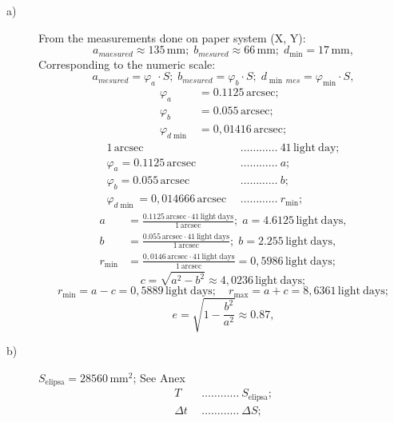 \begin{description}
\item[a)] From the measurements done on paper system (X, Y):
  \[
    a_{maesured} \approx 135\,\mathrm{mm};\;
    b_{mesured} \approx 66\,\mathrm{mm};\;
    d_{\min} = 17\,\mathrm{mm},
  \]
  Corresponding to the numeric scale:
  \[
    a_{mesured} = \varphi_a\cdot S;\;
    b_{mesured} = \varphi_b\cdot S;\;
    d_{\min\,mes} = \varphi_{\min}\cdot S,
  \]
  \begin{align*}
    \varphi_a &= 0.1125\,\mathrm{arcsec};\\
    \varphi_b &= 0.055\,\mathrm{arcsec};\\
    \varphi_{d\min} &= 0{,}01416\,\mathrm{arcsec};
  \end{align*}
  \begin{align*}
    1\,\mathrm{arcsec}\ &\ \dots\dots\dots\dots\ 41\,\mathrm{light\ day};\\
    \varphi_a = 0.1125\,\mathrm{arcsec}\ &\ \dots\dots\dots\dots\ a;\\
    \varphi_b = 0.055\,\mathrm{arcsec}\ &\ \dots\dots\dots\dots\ b;\\
    \varphi_{d\min} = 0{,}014666\,\mathrm{arcsec}\ &\ \dots\dots\dots\dots\ r_{\min};
  \end{align*}
  \begin{align*}
    a &= \frac{0.1125\,\mathrm{arcsec}\cdot41\,\mathrm{light\ days}}
              {1\,\mathrm{arcsec}};\;
    a = 4.6125\,\mathrm{light\ days},\\
    b &= \frac{0.055\,\mathrm{arcsec}\cdot41\,\mathrm{light\ days}}
              {1\,\mathrm{arcsec}};\;
    b = 2.255\,\mathrm{light\ days},\\
    r_{\min} &= \frac{0{,}0146\,\mathrm{arcsec}\cdot41\,\mathrm{light\ days}}
              {1\,\mathrm{arcsec}} = 0{,}5986\,\mathrm{light\ days};
  \end{align*}
  \[
    c = \sqrt{a^2 - b^2} \approx 4{,}0236\,\mathrm{light\ days};
  \]
  \[
    r_{\min} = a - c = 0{,}5889\,\mathrm{light\ days};\quad
    r_{\max} = a + c = 8{,}6361\,\mathrm{light\ days};
  \]
  \[
    e = \sqrt{1 - \frac{b^2}{a^2}} \approx 0.87,
  \]
\item[b)] $S_{\mathrm{elipsa}} = 28560\,\mathrm{mm}^2$; See Anex %
  \begin{align*}
    T\ &\ \dots\dots\dots\dots\ S_{\mathrm{elipsa}};\\
    \Delta t\ &\ \dots\dots\dots\dots\ \Delta S;\\

\end{align*}
\end{description}

